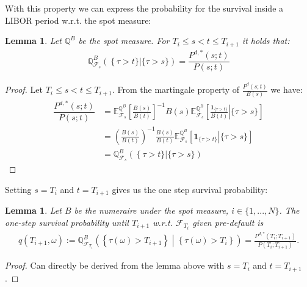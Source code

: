 \documentclass[12pt]{article}
\newtheorem{lemma}[theorem]{Lemma}
\begin{document}
	With this property we can express the probability for the survival inside a LIBOR period w.r.t. the spot measure:
	\begin{lemma}
		Let $\mathbb{Q}^B$ be the spot measure. For $T_i \le s < t \le T_{i+1}$ it holds that:
		\begin{align*}
			\mathbb{Q}^B_{\mathcal{F}_s}\left(\left  \{\tau > t\} \right| \{\tau > s\}\right) = \dfrac{P^{d,*}(s;t)}{P(s;t)}
		\end{align*}
	\end{lemma}
	\begin{proof}
		Let $T_i \le s < t \le T_{i+1}$. From the martingale property of $\frac{P^{d}(s;t)}{B(s)}$ we have:
		\begin{align*}
				\dfrac{P^{d,*}(s;t)}{P(s;t)} &= \mathbb{E}^{\mathbb{Q}^B}_{\mathcal{F}_{s}}\left[\frac{B(s)}{B(t)}\right]^{-1} B(s)\mathbb{E}^{\mathbb{Q}^B}_{\mathcal{F}_{s}}\left[\left.\frac{\mathbf{1}_{\{\tau > t\}}}{B(t)} \right| \{\tau> s\}\right]\\
				&= \left(\frac{B(s)}{B(t)}\right)^{-1} \frac{B(s)}{B(t)} \mathbb{E}^{\mathbb{Q}^B}_{\mathcal{F}_{s}}\left[ \left. \mathbf{1}_{\{\tau > t\}} \right| \{\tau> s\} \right]\\
				&= \mathbb{Q}^B_{\mathcal{F}_s}\left(\left  \{\tau > t\} \right| \{\tau > s\}\right)
		\end{align*}
	\end{proof}
	Setting $s=T_i$ and $t=T_{i+1}$ gives us the one step survival probability:
	\begin{lemma}
		Let $B$ be the numeraire under the spot measure, $i \in \{1, ..., N\}$.
		The one-step survival probability until $T_{i+1}$ w.r.t. $\mathcal{F}_{T_i}$ given pre-default is
		\begin{align}
			q(T_{i+1}, \omega) := \mathbb{Q}^B_{\mathcal{F}_{T_i}}\left( \left.\left\{\tau(\omega) > T_{i+1} \right\}  \;\right|\; \left\{\tau(\omega) > T_{i} \right\} \right) = \frac{P^{d,*}(T_i;T_{i+1})}{P(T_i;T_{i+1})}. \label{eq:oneStepSProbwrtF}
		\end{align}
	\end{lemma}
	\begin{proof}
		Can directly be derived from the lemma above with $s=T_i$ and $t=T_{i+1}$.
	\end{proof}
	
	
	
	
	
\end{document}
